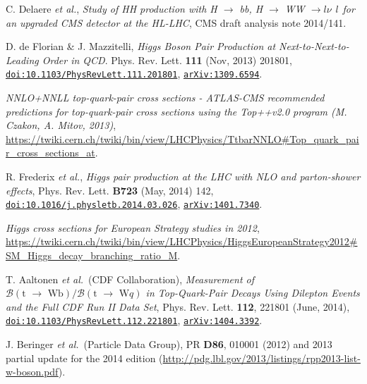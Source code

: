 \documentclass[10pt,a4paper]{article}
\newcommand{\etal}{\emph{et al.}}
\begin{document}
\begin{thebibliography}{1}

 C. Delaere \etal, \emph{Study of HH production with H $\rightarrow$ bb, H $\rightarrow$ WW $\rightarrow l \nu$ l\textnu\ for an upgraded CMS detector at the HL-LHC}, CMS draft analysis note 2014/141.

 D. de Florian \& J. Mazzitelli, \emph{Higgs Boson Pair Production at Next-to-Next-to-Leading Order in QCD}. Phys. Rev. Lett. \textbf{111} (Nov, 2013) 201801, \href{http://journals.aps.org/prl/abstract/10.1103/PhysRevLett.111.201801}{\texttt{doi:10.1103/PhysRevLett.111.201801}}, \href{http://arxiv.org/abs/1309.6594}{\texttt{arXiv:1309.6594}}.

 \emph{NNLO+NNLL top-quark-pair cross sections - ATLAS-CMS recommended predictions for top-quark-pair cross sections using the Top++v2.0 program (M. Czakon, A. Mitov, 2013)}, \url{https://twiki.cern.ch/twiki/bin/view/LHCPhysics/TtbarNNLO#Top_quark_pair_cross_sections_at}.

 R. Frederix \etal, \emph{Higgs pair production at the LHC with NLO and parton-shower effects}, Phys. Rev. Lett. \textbf{B723} (May, 2014) 142, \href{http://dx.doi.org/10.1016/j.physletb.2014.03.026}{\texttt{doi:10.1016/j.physletb.2014.03.026}}, \href{http://link.aps.org/doi/10.1103/PhysRevLett.112.221801}{\texttt{arXiv:1401.7340}}.

 \emph{Higgs cross sections for European Strategy studies in 2012}, \url{https://twiki.cern.ch/twiki/bin/view/LHCPhysics/HiggsEuropeanStrategy2012#SM_Higgs_decay_branching_ratio_M}.


 T. Aaltonen \etal\ (CDF Collaboration), \emph{Measurement of $\mathcal{B}(\text{t $\rightarrow$ Wb}) / \mathcal{B}(\text{t $\rightarrow$ W$q$})$ in Top-Quark-Pair Decays Using Dilepton Events and the Full CDF Run II Data Set}, Phys. Rev. Lett. \textbf{112}, 221801 (June, 2014), \href{http://journals.aps.org/prl/abstract/10.1103/PhysRevLett.112.221801}{\texttt{doi:10.1103/PhysRevLett.112.221801}}, \href{http://arxiv.org/abs/1404.3392}{\texttt{arXiv:1404.3392}}.

 J. Beringer \etal\ (Particle Data Group), PR \textbf{D86}, 010001 (2012) and 2013 partial update for the 2014 edition (\url{http://pdg.lbl.gov/2013/listings/rpp2013-list-w-boson.pdf}).

%

\end{thebibliography}
\end{document}
